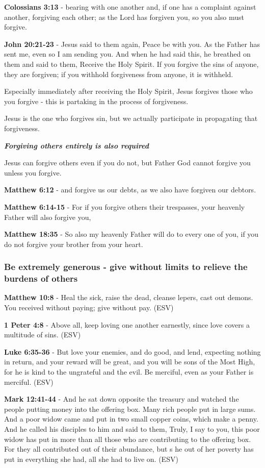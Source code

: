 \documentclass[11pt]{article}
\begin{document}
\textbf{Colossians 3:13} - bearing with one another and, if one has a complaint against another, forgiving each other; as the Lord has forgiven you, so you also must forgive.

\textbf{John 20:21-23} - Jesus said to them again, Peace be with you. As the Father has sent me, even so I am sending you. And when he had said this, he breathed on them and said to them, Receive the Holy Spirit. If you forgive the sins of anyone, they are forgiven; if you withhold forgiveness from anyone, it is withheld.

Especially immediately after receiving the Holy Spirit, Jesus forgives those who you forgive - this is partaking in the process of forgiveness.

Jesus is the one who forgives sin, but we actually participate in propagating that forgiveness.

\emph{\textbf{Forgiving others entirely is also required}}

Jesus can forgive others even if you do not, but Father God cannot forgive you unless you forgive.

\textbf{Matthew 6:12} - and forgive us our debts, as we also have forgiven our debtors.

\textbf{Matthew 6:14-15} - For if you forgive others their trespasses, your heavenly Father will also forgive you,

\textbf{Matthew 18:35} - So also my heavenly Father will do to every one of you, if you do not forgive your brother from your heart.

\subsubsection{Be extremely generous - give without limits to relieve the burdens of others}
\label{sec:org165977d}
\textbf{Matthew 10:8} - Heal the sick, raise the dead, cleanse lepers, cast out demons. You received without paying; give without pay. (ESV)

\textbf{1 Peter 4:8} - Above all, keep loving one another earnestly, since love covers a multitude of sins. (ESV)

\textbf{Luke 6:35-36} - But love your enemies, and do good, and lend, expecting nothing in return, and your reward will be great, and you will be sons of the Most High, for he is kind to the ungrateful and the evil. Be merciful, even as your Father is merciful. (ESV)

\textbf{Mark 12:41-44} - And he sat down opposite the treasury and watched the people putting money into the offering box. Many rich people put in large sums. And a poor widow came and put in two small copper coins, which make a penny. And he called his disciples to him and said to them, Truly, I say to you, this poor widow has put in more than all those who are contributing to the offering box. For they all contributed out of their abundance, but s he out of her poverty has put in everything she had, all she had to live on. (ESV)
\end{document}

